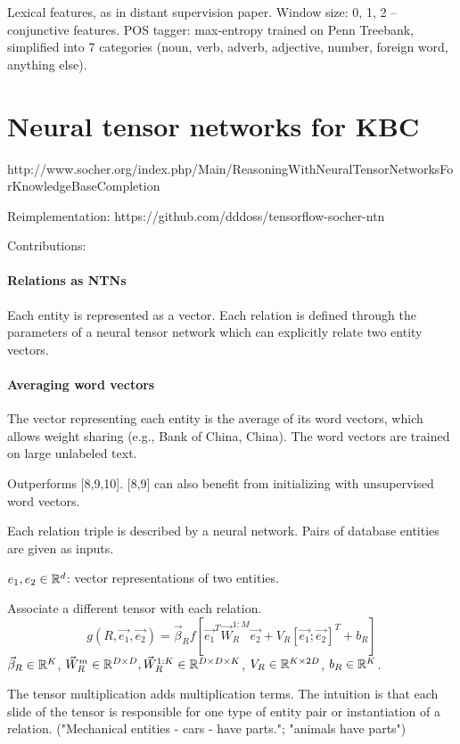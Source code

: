 Lexical features, as in distant supervision paper. Window size: 0, 1, 2 --
conjunctive features. POS tagger: max-entropy trained on Penn Treebank,
simplified into 7 categories (noun, verb, adverb, adjective, number, foreign
word, anything else).

\section{Neural tensor networks for KBC}
\label{neural-tensor-networks-for-kbc}

http://www.socher.org/index.php/Main/ReasoningWithNeuralTensorNetworksForKnowledgeBaseCompletion

Reimplementation: https://github.com/dddoss/tensorflow-socher-ntn

Contributions:

\paragraph{Relations as NTNs}
Each entity is represented as a vector. Each relation is defined through the
parameters of a neural tensor network which can explicitly relate two entity
vectors.

\paragraph{Averaging word vectors}
The vector representing each entity is the average of its word vectors, which
allows weight sharing (e.g., Bank of China, China).
The word vectors are trained on large unlabeled text.

Outperforms [8,9,10]. [8,9] can also benefit from initializing with unsupervised
word vectors.

Each relation triple is described by a neural network. Pairs of database
entities are given as inputs.

$e_1, e_2\in\mathbb{R}^d$: vector representations of two entities.

Associate a different tensor with each relation.
$$g(R,\vec{e_1},\vec{e_2}) = \vec{\beta}_R f[\vec{e_1}^T \vec{W}_R^{1:M}
\vec{e_2} + V_R [\vec{e_1};\vec{e_2}]^T + b_R]$$
$\vec{\beta}_R\in\mathbb{R}^K$, $\vec{W}_R^m\in\mathbb{R}^{D\times D}, \vec{W}^{1:K}_R\in\mathbb{R}^{D\times
D\times K}$, $V_R\in\mathbb{R}^{K\times 2D}$, $b_R\in\mathbb{R}^K$.

The tensor multiplication adds multiplication terms.
The intuition is that each slide of the tensor is responsible for one type of
entity pair or instantiation of a relation. ("Mechanical entities - cars - have
parts."; "animals have parts")

